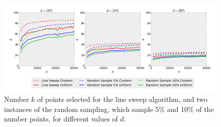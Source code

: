 \begin{figure}[!h] 
	\vspace{-10pt}
	\centering
	\includegraphics[width=\linewidth]{Pictures/ls_rs_k} 
	\caption[Number $k$ of points selected for Line Sweep and Random Sampling algorithms.]{Number $k$ of points selected for the line sweep algorithm, and two instances of the random sampling, which sample 5\% and 10\% of the number points, for different values of $d$.}
	\label{fig:ls_rs_k} 
\end{figure}